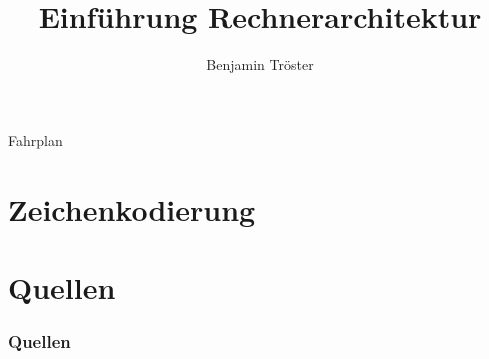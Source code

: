 \documentclass[12pt%
,xcolor=table
,aspectratio=169%
]{beamer}
\author{Benjamin Tröster}
\title[Rechnerarchitektur]{Einführung Rechnerarchitektur}
\institute[HTW Berlin]{Hochschule für Technik und Wirtschaft Berlin}
\begin{document}
\begin{frame}
\titlepage
\end{frame}

\begin{frame}{Fahrplan}
\tableofcontents[hideothersubsections]
\end{frame}

\section{Zeichenkodierung}





\section*{Quellen}
\appendix
\begin{frame}[allowframebreaks]
  \frametitle<presentation>{Quellen}
\printbibliography
\end{frame}
\end{document}
